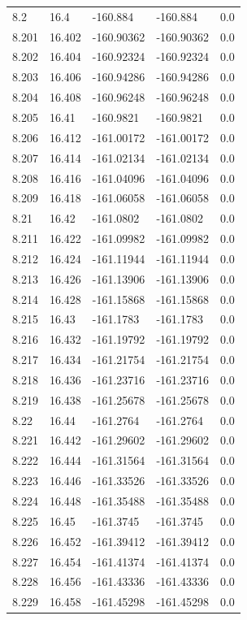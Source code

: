 \begin{tabular}{lllll}
8.2 & 16.4 & -160.884 & -160.884 & 0.0 \\
8.201 & 16.402 & -160.90362 & -160.90362 & 0.0 \\
8.202 & 16.404 & -160.92324 & -160.92324 & 0.0 \\
8.203 & 16.406 & -160.94286 & -160.94286 & 0.0 \\
8.204 & 16.408 & -160.96248 & -160.96248 & 0.0 \\
8.205 & 16.41 & -160.9821 & -160.9821 & 0.0 \\
8.206 & 16.412 & -161.00172 & -161.00172 & 0.0 \\
8.207 & 16.414 & -161.02134 & -161.02134 & 0.0 \\
8.208 & 16.416 & -161.04096 & -161.04096 & 0.0 \\
8.209 & 16.418 & -161.06058 & -161.06058 & 0.0 \\
8.21 & 16.42 & -161.0802 & -161.0802 & 0.0 \\
8.211 & 16.422 & -161.09982 & -161.09982 & 0.0 \\
8.212 & 16.424 & -161.11944 & -161.11944 & 0.0 \\
8.213 & 16.426 & -161.13906 & -161.13906 & 0.0 \\
8.214 & 16.428 & -161.15868 & -161.15868 & 0.0 \\
8.215 & 16.43 & -161.1783 & -161.1783 & 0.0 \\
8.216 & 16.432 & -161.19792 & -161.19792 & 0.0 \\
8.217 & 16.434 & -161.21754 & -161.21754 & 0.0 \\
8.218 & 16.436 & -161.23716 & -161.23716 & 0.0 \\
8.219 & 16.438 & -161.25678 & -161.25678 & 0.0 \\
8.22 & 16.44 & -161.2764 & -161.2764 & 0.0 \\
8.221 & 16.442 & -161.29602 & -161.29602 & 0.0 \\
8.222 & 16.444 & -161.31564 & -161.31564 & 0.0 \\
8.223 & 16.446 & -161.33526 & -161.33526 & 0.0 \\
8.224 & 16.448 & -161.35488 & -161.35488 & 0.0 \\
8.225 & 16.45 & -161.3745 & -161.3745 & 0.0 \\
8.226 & 16.452 & -161.39412 & -161.39412 & 0.0 \\
8.227 & 16.454 & -161.41374 & -161.41374 & 0.0 \\
8.228 & 16.456 & -161.43336 & -161.43336 & 0.0 \\
8.229 & 16.458 & -161.45298 & -161.45298 & 0.0 \\

\end{tabular}
